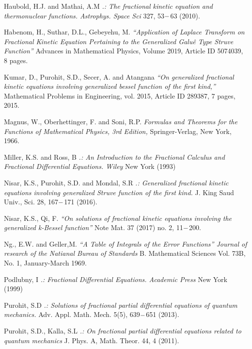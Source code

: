\documentclass{article}
\begin{document}
\begin{thebibliography}{9}
    Haubold, H.J. and Mathai, A.M
    \textit{.: The fractional kinetic equation and thermonuclear functions. Astrophys. Space Sci}
    327, 53$\--$63 (2010).

    Habenom, H., Suthar, D.L., Gebeyehu, M.
    \textit{“Application of Laplace Transform on Fractional Kinetic Equation Pertaining to the Generalized Galu\^e Type Struve Function”}
    Advances in Mathematical Physics, Volume 2019, Article ID 5074039, 8 pages.

    Kumar, D., Purohit, S.D., Secer, A. and Atangana
    \textit{“On generalized fractional kinetic equations involving generalized bessel function of the first kind,”}
    Mathematical Problems in Engineering, vol. 2015, Article ID 289387, 7 pages, 2015.

    Magnus, W., Oberhettinger, F. and Soni, R.P.
    \textit{Formulas and Theorems for the Functions of Mathematical Physics, 3rd Edition,}
    Springer-Verlag, New York, 1966.

    Miller, K.S. and Ross, B
    \textit{.: An Introduction to the Fractional Calculus and Fractional Differential Equations. Wiley}
    New York (1993)

    Nisar, K.S., Purohit, S.D. and Mondal, S.R
    \textit{.: Generalized fractional kinetic equations involving generalized Struve function of the first kind.}
    J. King Saud Univ., Sci. 28, 167$\--$171 (2016).

    Nisar, K.S., Qi, F.
    \textit{“On solutions of fractional kinetic equations involving the generalized k-Bessel function”}
    Note Mat. 37 (2017) no. 2, 11$\--$200.

    Ng., E.W.  and Geller,M.
    \textit{“A Table of Integrals of the Error Functions” Journal  of research of the Natianal Bureau of Standards}
    B. Mathematical Sciences Vol. 73B, No. 1, January-March 1969.

    Podlubny, I
    \textit{.: Fractional Differential Equations. Academic Press}
    New York (1999)

    Purohit, S.D
    \textit{.: Solutions of fractional partial differential equations of quantum mechanics.}
    Adv. Appl. Math. Mech. 5(5), 639$\--$651 (2013).

    Purohit, S.D., Kalla, S.L
    \textit{.: On fractional partial differential equations related to quantum mechanics}
    J. Phys. A, Math. Theor. 44, 4 (2011).


\end{thebibliography}
\end{document}
